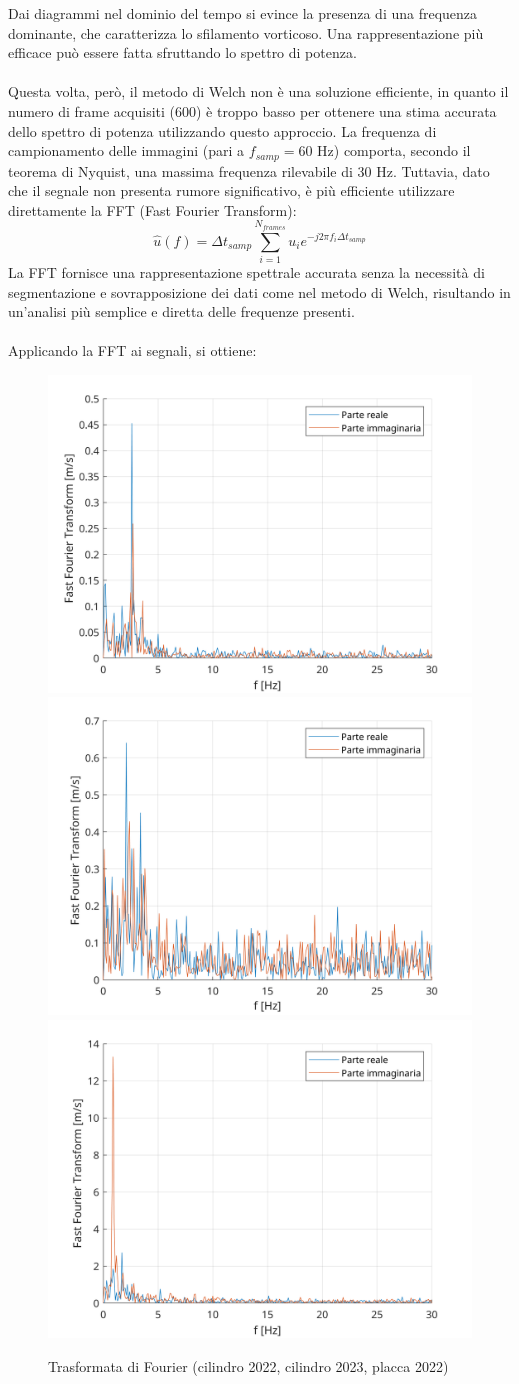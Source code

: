 \noindent Dai diagrammi nel dominio del tempo si evince la presenza di una frequenza dominante, che caratterizza lo sfilamento vorticoso. Una rappresentazione più efficace può essere fatta sfruttando lo spettro di potenza.\\\\
Questa volta, però, il metodo di Welch non è una soluzione efficiente, in quanto il numero di frame acquisiti (600) è troppo basso per ottenere una stima accurata dello spettro di potenza utilizzando questo approccio. La frequenza di campionamento delle immagini (pari a $f_{samp}=60$ Hz) comporta, secondo il teorema di Nyquist, una massima frequenza rilevabile di 30 Hz. Tuttavia, dato che il segnale non presenta rumore significativo, è più efficiente utilizzare direttamente la FFT (Fast Fourier Transform):
\begin{equation*}
    \hat u(f) = \Delta t_{samp} \sum_{i=1}^{N_{frames}} u_i e^{-j2\pi f_i \Delta t_{samp}}
\end{equation*}
La FFT fornisce una rappresentazione spettrale accurata senza la necessità di segmentazione e sovrapposizione dei dati come nel metodo di Welch, risultando in un'analisi più semplice e diretta delle frequenze presenti.\\\\
Applicando la FFT ai segnali, si ottiene:
\begin{figure}[H]
    \centering
    \includegraphics[width=.49\textwidth]{images/11/FFT22.png}
    \includegraphics[width=.49\textwidth]{images/11/FFT23.png}
    \includegraphics[width=.49\textwidth]{images/11/FFT220.png}
    \caption{Trasformata di Fourier (cilindro 2022, cilindro 2023, placca 2022)}
\end{figure}

